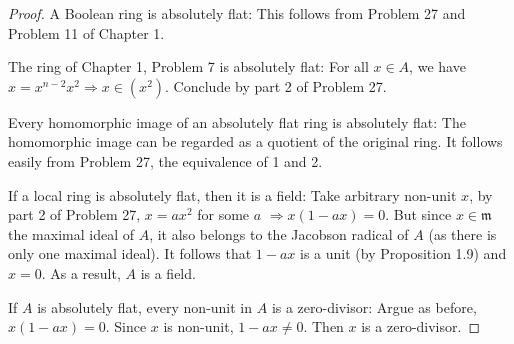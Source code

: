 \documentclass{solution}
\begin{document}
\begin{proof}
    A Boolean ring is absolutely flat: This follows from Problem 27 and Problem 11 of Chapter 1.

    The ring of Chapter 1, Problem 7 is absolutely flat: For all $x \in A$, we have $x = x^{n - 2} x^2 \Rightarrow x \in (x^2)$. Conclude by part 2 of Problem 27.

    Every homomorphic image of an absolutely flat ring is absolutely flat: The homomorphic image can be regarded as a quotient of the original ring. It follows easily from Problem 27, the equivalence of 1 and 2.

    If a local ring is absolutely flat, then it is a field: Take arbitrary non-unit $x$, by part 2 of Problem 27, $x = ax^2$ for some $a$ $\Rightarrow x(1 - ax) = 0$. But since $x \in \mathfrak{m}$ the maximal ideal of $A$, it also belongs to the Jacobson radical of $A$ (as there is only one maximal ideal). It follows that $1 - ax$ is a unit (by Proposition 1.9) and $x = 0$. As a result, $A$ is a field.

    If $A$ is absolutely flat, every non-unit in $A$ is a zero-divisor: Argue as before, $x(1 - ax) = 0$. Since $x$ is non-unit, $1 - ax \ne 0$. Then $x$ is a zero-divisor.
\end{proof}
\end{document}
